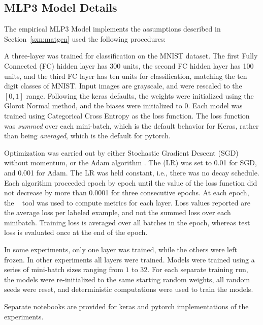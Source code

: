 

\subsection{MLP3 Model Details}
\label{sxn:appendix_MLP3details}



The empirical MLP3 Model implements the assumptions described in Section~\ref{sxn:matgen} used the following 
procedures:

A three-layer \MultiLayerPerceptron was trained for classification on the MNIST dataset\cite{MNIST1998}. The first Fully 
Connected (FC) hidden layer has 300 units, the second FC hidden layer has 100 units, and the third FC layer has ten 
units for classification, matching the ten digit classes of MNIST. Input images are grayscale, and were rescaled to the 
$[0, 1]$ range. Following the keras\cite{keras2015} defaults, the weights were initialized using the Glorot 
Normal\cite{GloBen10} method, and the biases were initialized to $0$. Each model was trained using Categorical Cross 
Entropy as the loss function. The loss function was {\em summed} over each mini-batch, which is the default behavior for 
Keras, rather than being {\em averaged}, which is the default for pytorch\cite{pytorch2019}. 

Optimization was carried out by either Stochastic Gradient Descent (SGD) 
without momentum, or the Adam algorithm \cite{kingma2014_TR}. The \LearningRate (LR) was set to 0.01 for SGD, and 0.001 
for Adam. The LR was held constant, i.e., there was no decay schedule. Each algorithm proceeded epoch by epoch until the 
value of the loss function did not decrease by more than 0.0001 for three consecutive epochs. At each epoch, 
the \WW~ tool was used to compute metrics for each layer. Loss values reported are the average loss per labeled example, 
and not the summed loss over each minibatch. Training loss is averaged over all batches in the epoch, whereas test loss 
is evaluated once at the end of the epoch.

In some experiments, only one layer was trained, while the others were left frozen. In other experiments all layers were 
trained. Models were trained using a series of mini-batch sizes ranging from $1$ to $32$. For each separate training 
run, the models were re-initialized to the same starting random weights, all random seeds were reset, and deterministic 
computations were used to train the models.

Separate notebooks are provided for keras and pytorch implementations of the experiments.


